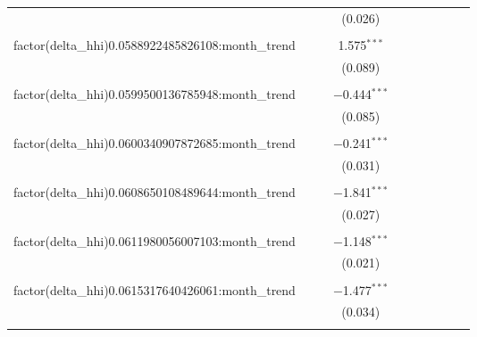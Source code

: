 \begin{table}[H]
{\begin{tabular}{@{\extracolsep{5pt}}lccccccccc}
   &  &  & (0.026) &  &  &  &  &  &  \\  

   & & & & & & & & & \\  

  factor(delta\_hhi)0.0588922485826108:month\_trend &  &  & 1.575$^{***}$ &  &  &  &  &  &  \\  

   &  &  & (0.089) &  &  &  &  &  &  \\  

   & & & & & & & & & \\  

  factor(delta\_hhi)0.0599500136785948:month\_trend &  &  & $-$0.444$^{***}$ &  &  &  &  &  &  \\  

   &  &  & (0.085) &  &  &  &  &  &  \\  

   & & & & & & & & & \\  

  factor(delta\_hhi)0.0600340907872685:month\_trend &  &  & $-$0.241$^{***}$ &  &  &  &  &  &  \\  

   &  &  & (0.031) &  &  &  &  &  &  \\  

   & & & & & & & & & \\  

  factor(delta\_hhi)0.0608650108489644:month\_trend &  &  & $-$1.841$^{***}$ &  &  &  &  &  &  \\  

   &  &  & (0.027) &  &  &  &  &  &  \\  

   & & & & & & & & & \\  

  factor(delta\_hhi)0.0611980056007103:month\_trend &  &  & $-$1.148$^{***}$ &  &  &  &  &  &  \\  

   &  &  & (0.021) &  &  &  &  &  &  \\  

   & & & & & & & & & \\  

  factor(delta\_hhi)0.0615317640426061:month\_trend &  &  & $-$1.477$^{***}$ &  &  &  &  &  &  \\  

   &  &  & (0.034) &  &  &  &  &  &  \\  

   & & & & & & & & & \\  


\end{tabular}}
\end{table}
